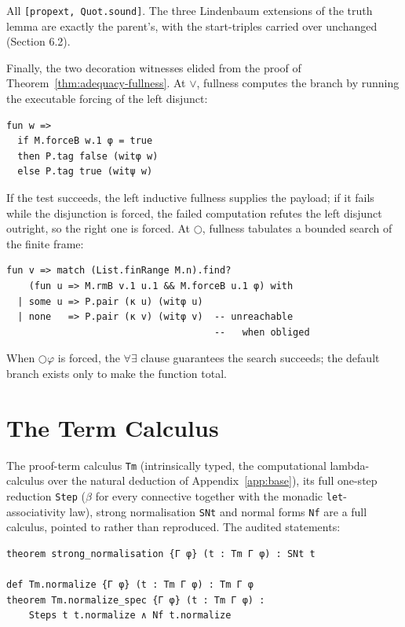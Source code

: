 \noindent All \texttt{[propext, Quot.sound]}. The three Lindenbaum
extensions of the truth lemma are exactly the parent's, with the
start-triples carried over unchanged (Section 6.2).

Finally, the two decoration witnesses elided from the proof of
Theorem~\ref{thm:adequacy-fullness}. At \ensuremath{\vee}, fullness computes
the branch by running the executable forcing of the left disjunct:

\begin{lstlisting}
fun w =>
  if M.forceB w.1 φ = true
  then P.tag false (witφ w)
  else P.tag true (witψ w)
\end{lstlisting}

\noindent If the test succeeds, the left inductive fullness supplies the
payload; if it fails while the disjunction is forced, the failed
computation refutes the left disjunct outright, so the right one is
forced. At \ensuremath{\bigcirc}, fullness tabulates a bounded search of the
finite frame:

\begin{lstlisting}
fun v => match (List.finRange M.n).find?
    (fun u => M.rmB v.1 u.1 && M.forceB u.1 φ) with
  | some u => P.pair (κ u) (witφ u)
  | none   => P.pair (κ v) (witφ v)  -- unreachable
                                     --   when obliged
\end{lstlisting}

\noindent When \ensuremath{\bigcirc\varphi} is forced, the \ensuremath{\forall\exists}
clause guarantees the search succeeds; the default branch exists only to
make the function total.

\section{The Term Calculus}\label{app:terms}

The proof-term calculus \texttt{Tm} (intrinsically typed, the
computational lambda-calculus over the natural deduction of
Appendix~\ref{app:base}), its full one-step reduction \texttt{Step}
(\ensuremath{\beta} for every connective together with the monadic
\texttt{let}-associativity law), strong normalisation \texttt{SNt} and
normal forms \texttt{Nf} are a full calculus, pointed to rather than
reproduced. The audited statements:

\begin{lstlisting}
theorem strong_normalisation {Γ φ} (t : Tm Γ φ) : SNt t

def Tm.normalize {Γ φ} (t : Tm Γ φ) : Tm Γ φ
theorem Tm.normalize_spec {Γ φ} (t : Tm Γ φ) :
    Steps t t.normalize ∧ Nf t.normalize
\end{lstlisting}

